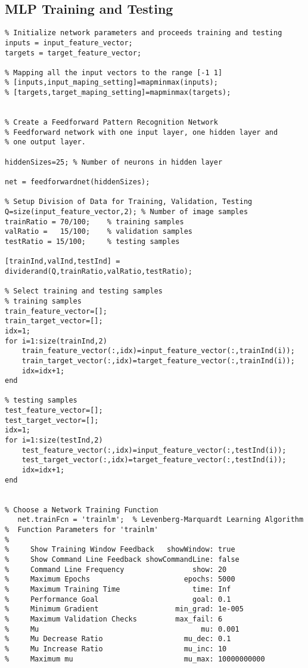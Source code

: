 \subsection*{MLP Training and Testing}
\begin{lstlisting}
% Initialize network parameters and proceeds training and testing
inputs = input_feature_vector;
targets = target_feature_vector;

% Mapping all the input vectors to the range [-1 1]
% [inputs,input_maping_setting]=mapminmax(inputs);
% [targets,target_maping_setting]=mapminmax(targets);


% Create a Feedforward Pattern Recognition Network
% Feedforward network with one input layer, one hidden layer and
% one output layer.

hiddenSizes=25; % Number of neurons in hidden layer

net = feedforwardnet(hiddenSizes);

% Setup Division of Data for Training, Validation, Testing
Q=size(input_feature_vector,2); % Number of image samples
trainRatio = 70/100;    % training samples
valRatio =   15/100;    % validation samples
testRatio = 15/100;     % testing samples

[trainInd,valInd,testInd] = dividerand(Q,trainRatio,valRatio,testRatio);

% Select training and testing samples
% training samples
train_feature_vector=[];
train_target_vector=[];
idx=1;
for i=1:size(trainInd,2)
	train_feature_vector(:,idx)=input_feature_vector(:,trainInd(i));
	train_target_vector(:,idx)=target_feature_vector(:,trainInd(i));
	idx=idx+1;
end

% testing samples
test_feature_vector=[];
test_target_vector=[];
idx=1;
for i=1:size(testInd,2)
	test_feature_vector(:,idx)=input_feature_vector(:,testInd(i));
	test_target_vector(:,idx)=target_feature_vector(:,testInd(i));
	idx=idx+1;
end


% Choose a Network Training Function
   net.trainFcn = 'trainlm';  % Levenberg-Marquardt Learning Algorithm
%  Function Parameters for 'trainlm'
%
%     Show Training Window Feedback   showWindow: true
%     Show Command Line Feedback showCommandLine: false
%     Command Line Frequency                show: 20
%     Maximum Epochs                      epochs: 5000
%     Maximum Training Time                 time: Inf
%     Performance Goal                      goal: 0.1
%     Minimum Gradient                  min_grad: 1e-005
%     Maximum Validation Checks         max_fail: 6
%     Mu                                      mu: 0.001
%     Mu Decrease Ratio                   mu_dec: 0.1
%     Mu Increase Ratio                   mu_inc: 10
%     Maximum mu                          mu_max: 10000000000


\end{lstlisting}
